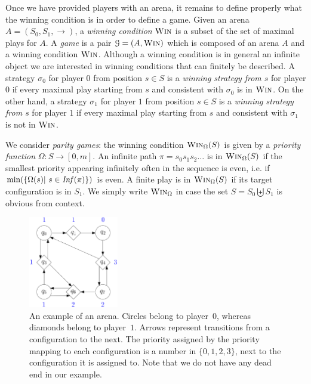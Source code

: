 \documentclass[a4paper,UKenglish,cleveref, autoref, thm-restate]{lipics-v2021}
\newcommand{\win}{\textsc{Win}}
\begin{document}
Once we have provided players with an arena, it remains to define  properly what the winning condition is in order to define a game. Given an arena $A = (S_0, S_1, \rightarrow)$, a {\em winning condition}
$\win$
is a subset  
of the set of maximal plays for $A$. A {\em game} is a pair $\mathcal{G}= (A, \win)$ which is composed of an arena $A$ and a winning condition $\win$.
Although a winning condition is in general an infinite object we are interested in winning conditions 
that can finitely be described.
A strategy $\sigma_0$ for player $0$ from position $s \in S$ is a {\em winning strategy
 from $s$} for player $0$ if 
every maximal play starting from $s$ and consistent with $\sigma_0$ is in $\win$.
On the other hand, a strategy $\sigma_1$ for player $1$ from position $s \in S$ is a {\em winning strategy
 from $s$} for player $1$ if 
every maximal play starting from $s$ and consistent with $\sigma_1$ is not in $\win$.
 






We consider {\em parity games}: 
the winning condition $\win_\Omega(S)$ is given by a {\em priority function} 
 $\Omega : S \to  [0, m]$.
An infinite path $ \pi = s_0 s_1 s_2 \ldots$ is in $\win_\Omega(S)$ if the smallest priority appearing infinitely often in
the sequence 
 is even, i.e.
if $\min( \{ \Omega(s) | ~ s \in \text{\textit{Inf}}( \pi) \})$ is even.  
A finite play is in $\win_\Omega(S)$ if its target configuration is in $S_1$.
We simply write
$\win_\Omega$ in case the set $S = S_0 \biguplus S_1$ is obvious from context.


\begin{center}
	\begin{figure}
			\hspace{3.95cm}
\includegraphics[width=0.35\textwidth]{figures/parity_game}
	\caption{An example of an arena. Circles  belong to player~$0$, whereas diamonds belong to player~$1$. Arrows represent transitions from a configuration to the next. The priority assigned by the priority mapping to each configuration is a number in $\{0,1,2,3\}$, next to the configuration it is assigned to. Note that we do not have any dead end in our example.}
	\label{example_parity_game}
	\end{figure}
\end{center}
\end{document}
